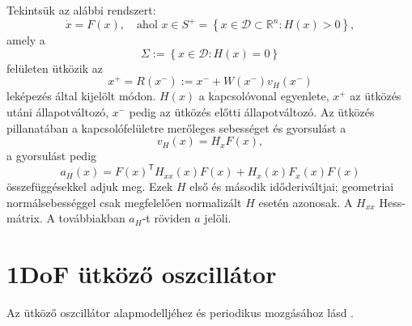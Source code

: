 Tekintsük az alábbi rendszert:
\begin{equation}
\dot{x}=F(x), \quad \text{ahol } x\in S^+=\left\{x\in\mathcal{D}\subset\mathbb{R}^n: H(x)>0\right\},
\end{equation}
amely a
\begin{equation}
\Sigma:=\left\{x\in\mathcal{D}: H(x)=0\right\}
\end{equation}
felületen ütközik az
\begin{equation}
x^+=R(x^-):=x^-+W(x^-)v_H(x^-)
\end{equation}
leképezés által kijelölt módon. $H(x)$ a kapcsolóvonal egyenlete, $x^+$ az ütközés utáni állapotváltozó, $x^-$ pedig az ütközés előtti állapotváltozó. Az ütközés pillanatában a kapcsolófelületre merőleges sebességet és gyorsulást a
\begin{equation}
v_H(x)=H_xF(x),
\end{equation}
a gyorsulást pedig
\begin{equation}
 a_H(x)=F(x)^\mathsf T H_{xx}(x)F(x)+H_x(x)F_x(x)F(x)
\end{equation}
összefüggésekkel adjuk meg. Ezek $H$ első és második időderiváltjai; geometriai normálsebességgel csak megfelelően normalizált $H$ esetén azonosak. A $H_{xx}$ Hess-mátrix. A továbbiakban $a_H$-t röviden $a$ jelöli.
\exampleend

\section{1DoF ütköző oszcillátor}
\examplebody

Az ütköző oszcillátor alapmodelljéhez és periodikus mozgásához lásd \cite[1.2.1--1.2.2. és 6.1. szakasz]{dib}.


